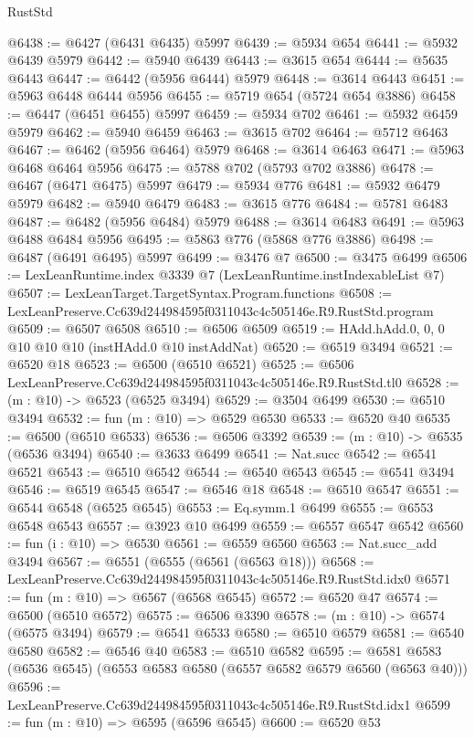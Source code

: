 \begin{lexlean}{RustStd}
\begin{coremodule}
@6438 := @6427 (@6431 @6435) @5997
@6439 := @5934 @654
@6441 := @5932 @6439 @5979
@6442 := @5940 @6439
@6443 := @3615 @654
@6444 := @5635 @6443
@6447 := @6442 (@5956 @6444) @5979
@6448 := @3614 @6443
@6451 := @5963 @6448 @6444 @5956
@6455 := @5719 @654 (@5724 @654 @3886)
@6458 := @6447 (@6451 @6455) @5997
@6459 := @5934 @702
@6461 := @5932 @6459 @5979
@6462 := @5940 @6459
@6463 := @3615 @702
@6464 := @5712 @6463
@6467 := @6462 (@5956 @6464) @5979
@6468 := @3614 @6463
@6471 := @5963 @6468 @6464 @5956
@6475 := @5788 @702 (@5793 @702 @3886)
@6478 := @6467 (@6471 @6475) @5997
@6479 := @5934 @776
@6481 := @5932 @6479 @5979
@6482 := @5940 @6479
@6483 := @3615 @776
@6484 := @5781 @6483
@6487 := @6482 (@5956 @6484) @5979
@6488 := @3614 @6483
@6491 := @5963 @6488 @6484 @5956
@6495 := @5863 @776 (@5868 @776 @3886)
@6498 := @6487 (@6491 @6495) @5997
@6499 := @3476 @7
@6500 := @3475 @6499
@6506 := LexLeanRuntime.index @3339 @7 (LexLeanRuntime.instIndexableList @7)
@6507 := LexLeanTarget.TargetSyntax.Program.functions
@6508 := LexLeanPreserve.Cc639d244984595f0311043c4c505146e.R9.RustStd.program
@6509 := @6507 @6508
@6510 := @6506 @6509
@6519 := HAdd.hAdd.{0, 0, 0} @10 @10 @10 (instHAdd.{0} @10 instAddNat)
@6520 := @6519 @3494
@6521 := @6520 @18
@6523 := @6500 (@6510 @6521)
@6525 := @6506 LexLeanPreserve.Cc639d244984595f0311043c4c505146e.R9.RustStd.tl0
@6528 := (m : @10) -> @6523 (@6525 @3494)
@6529 := @3504 @6499
@6530 := @6510 @3494
@6532 := fun (m : @10) => @6529 @6530
@6533 := @6520 @40
@6535 := @6500 (@6510 @6533)
@6536 := @6506 @3392
@6539 := (m : @10) -> @6535 (@6536 @3494)
@6540 := @3633 @6499
@6541 := Nat.succ
@6542 := @6541 @6521
@6543 := @6510 @6542
@6544 := @6540 @6543
@6545 := @6541 @3494
@6546 := @6519 @6545
@6547 := @6546 @18
@6548 := @6510 @6547
@6551 := @6544 @6548 (@6525 @6545)
@6553 := Eq.symm.{1} @6499
@6555 := @6553 @6548 @6543
@6557 := @3923 @10 @6499
@6559 := @6557 @6547 @6542
@6560 := fun (i : @10) => @6530
@6561 := @6559 @6560
@6563 := Nat.succ_add @3494
@6567 := @6551 (@6555 (@6561 (@6563 @18)))
@6568 := LexLeanPreserve.Cc639d244984595f0311043c4c505146e.R9.RustStd.idx0
@6571 := fun (m : @10) => @6567 (@6568 @6545)
@6572 := @6520 @47
@6574 := @6500 (@6510 @6572)
@6575 := @6506 @3390
@6578 := (m : @10) -> @6574 (@6575 @3494)
@6579 := @6541 @6533
@6580 := @6510 @6579
@6581 := @6540 @6580
@6582 := @6546 @40
@6583 := @6510 @6582
@6595 := @6581 @6583 (@6536 @6545) (@6553 @6583 @6580 (@6557 @6582 @6579 @6560 (@6563 @40)))
@6596 := LexLeanPreserve.Cc639d244984595f0311043c4c505146e.R9.RustStd.idx1
@6599 := fun (m : @10) => @6595 (@6596 @6545)
@6600 := @6520 @53

\end{coremodule}
\end{lexlean}

